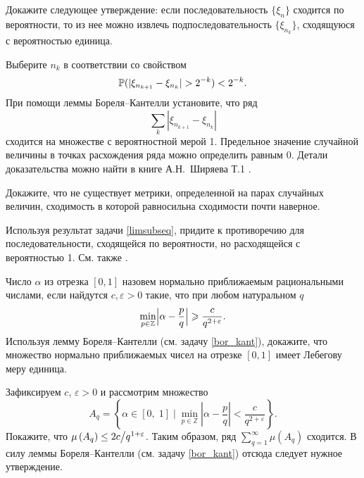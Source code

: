 \begin{problem}
\label{limsubseq}
Докажите следующее утверждение: если последовательность $\{\xi_n\}$ сходится  по вероятности, то из нее можно извлечь подпоследовательность  $\{\xi_{n_k}\}$, сходящуюся с вероятностью единица.   
\end{problem}

\begin{ordre}
Выберите $n_k$ в соответствии со свойством
\[
\mathrm{{\mathbb P}}(|\xi_{n_{k+1}} - \xi_{n_k}| > 2^{-k}) < 2^{-k}. 
\]
При помощи леммы  Бореля--Кантелли установите, что ряд \[\sum_k |\xi_{n_{k+1}} - \xi_{n_k}| \] сходится на множестве с вероятностной мерой 1. Предельное значение случайной величины в точках расхождения ряда можно определить равным $0$.
Детали доказательства можно найти в книге А.Н.~Ширяева Т.1 \cite{21}. 
\end{ordre}


\begin{problem}\Star
\label{limpnnero}
Докажите, что не существует метрики, определенной на парах случайных величин, сходимость в которой равносильна сходимости почти наверное.
\end{problem}

\begin{ordre}
Используя результат задачи \ref{limsubseq}, придите к противоречию для последовательности, сходящейся по вероятности, но расходящейся с вероятностью 1. См. также \cite{stoianov}.
\end{ordre}

\begin{problem}
Число $\alpha$ из отрезка $[0, 1]$ назовем нормально приближаемым рациональными числами, если найдутся $c,\varepsilon>0$ такие, что 
при любом натуральном $q$ 
\begin{equation*}
\label{BorelKantel}
\min\limits_{p\in {\mathbb Z}} \Bigl|\alpha-\frac{p}{q} \Bigr|\geqslant \frac{c}{q^{2+\varepsilon}} . 
\end{equation*}
Используя лемму Бореля--Кантелли (см. задачу \ref{bor_kant}), докажите, что множество нормально приближаемых чисел на отрезке $[0, 1]$ имеет Лебегову меру единица. 

\end{problem}
\begin{ordre}

Зафиксируем $c$, $\varepsilon >0$ и рассмотрим множество
\[A_{q} =\left\{\left. \alpha \in \left[0,\; 1\right]\; \right|\; \mathop{\min }\limits_{p\in {\mathbb Z}} \left|\alpha -\frac{p}{q} \right|<\frac{c}{q^{2+\varepsilon } } \right\}.\] 
Покажите, что $\mu \left(A_{q} \right)\le {2c\mathord{\left/ {\vphantom {2c q^{1+\varepsilon } }} \right. \kern-\nulldelimiterspace} q^{1+\varepsilon } } $. Таким образом, ряд $\sum_{q=1}^{\infty} \mu \left(A_{q} \right) $ сходится. В силу леммы Бореля--Кантелли (см. задачу \ref{bor_kant}) отсюда следует нужное утверждение.

\end{ordre}

